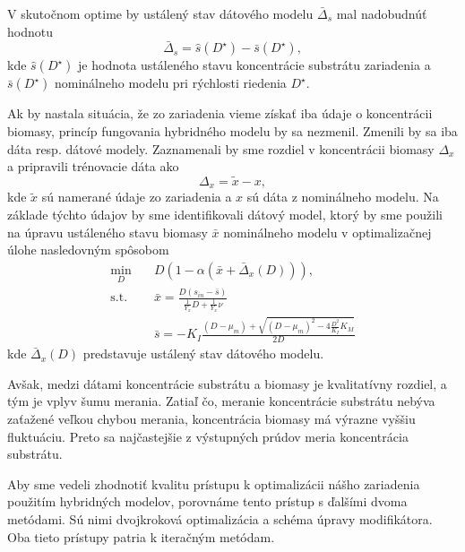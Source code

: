 V skutočnom optime by ustálený stav dátového modelu $ \bar{\Delta}_s $ mal nadobudnúť hodnotu
\begin{equation}
	\bar{\Delta}_s = \hat{s}\left(D^{\star}\right) - \bar{s}\left(D^{\star}\right),
\end{equation} 
kde $ \hat{s}\left(D^{\star}\right) $ je hodnota ustáleného stavu koncentrácie substrátu zariadenia a $ \bar{s}\left(D^{\star}\right) $ nominálneho modelu pri rýchlosti riedenia $ D^{\star} $.

Ak by nastala situácia, že zo zariadenia vieme získať iba údaje o koncentrácii biomasy, princíp fungovania hybridného modelu by sa nezmenil. Zmenili by sa iba dáta resp. dátové modely. Zaznamenali by sme rozdiel v koncentrácii biomasy $ \Delta_{x} $ a pripravili trénovacie dáta ako
\begin{equation}
	\Delta_{x} = \tilde{x} - x,
\end{equation} 
kde $ \tilde{x} $ sú namerané údaje zo zariadenia a $ x $ sú dáta z nominálneho modelu. Na základe týchto údajov by sme identifikovali dátový model, ktorý by sme použili na úpravu ustáleného stavu biomasy $ \bar{x} $ nominálneho modelu v optimalizačnej úlohe nasledovným spôsobom
\begin{equation}
\label{eq:hybrid_opt_bio}
	\begin{split}
		\min_{D} &\quad D\left(1-\alpha\left(\bar{x}+\bar{\Delta}_{x}(D)\right)\right), \\
		\text{s.t.} &\quad \bar{x} = \frac{D\left(s_{in}-\bar{s}\right)}{\frac{1}{Y_{x}}D + \frac{1}{Y_{x}}\nu} \\
		&\quad \bar{s} = -K_{I}\frac{\left(D-\mu_{m}\right) + \sqrt{\left(D-\mu_{m}\right)^2 - 4\frac{D^2}{K_{I}}K_{M}}}{2D}
	\end{split}
\end{equation}
kde $ \bar{\Delta}_{x}(D) $ predstavuje ustálený stav dátového modelu.

Avšak, medzi dátami koncentrácie substrátu a biomasy je kvalitatívny rozdiel, a tým je vplyv šumu merania. Zatiaľ čo, meranie koncentrácie substrátu nebýva zaťažené veľkou chybou merania, koncentrácia biomasy má výrazne vyššiu fluktuáciu. Preto sa najčastejšie z výstupných prúdov meria koncentrácia substrátu. 

Aby sme vedeli zhodnotiť kvalitu prístupu k optimalizácii nášho zariadenia použitím hybridných modelov, porovnáme tento prístup s ďalšími dvoma metódami. Sú nimi dvojkroková optimalizácia a schéma úpravy modifikátora. Oba tieto prístupy patria k iteračným metódam.

